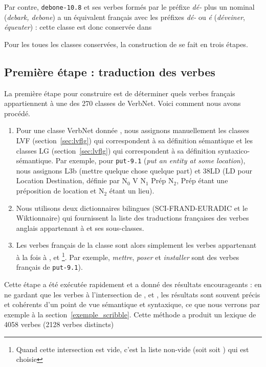Par contre, {\color{blue}\texttt{debone-10.8}} et ses verbes formés par le
préfixe \textit{dé-} plus un nominal (\textit{debark, debone}) a un équivalent
français avec les préfixes \textit{dé-} ou \textit{é} (\textit{déveiner},
\textit{équeuter}) : cette classe est donc conservée dans \verbenet{}

Pour les toues les classes conservées, la construction de \verbenet{} se fait
en trois étapes.

\subsection{Première étape : traduction des verbes}\label{first}

La première étape pour construire \verbenet{} est de déterminer quels verbes
français appartiennent à une des 270 classes de VerbNet. Voici comment nous
avons procédé.

\begin{enumerate}
    \item Pour une classe VerbNet donnée \Ce{}, nous assignons manuellement les
        classes LVF (section~\ref{sec:lvflg}) \Clvf{} qui correspondent à sa
        définition sémantique et les classes LG (section~\ref{sec:lvflg})
        \Clg{} qui correspondent à sa définition syntaxico-sémantique. Par
        exemple, pour {\color{blue}\texttt{put-9.1}} (\textit{put an entity at
        some location}), nous assignons {\color{red}L3b} (mettre quelque chose
        quelque part) et {\color{green}38LD} (LD pour Location Destination,
        définie par N$_0$ V N$_1$ Prép N$_2$, Prép étant une préposition de
        location et N$_2$ étant un lieu).
    \item Nous utilisons deux dictionnaires bilingues (SCI-FRAND-EURADIC et le
        Wiktionnaire) qui fournissent la liste \Ltrad{} des traductions
        françaises des verbes anglais appartenant à \Ce{} et ses sous-classes.
    \item Les verbes français de la classe \Ce{} sont alors simplement les
        verbes appartenant à la fois à \Ltrad{}, \Clvf{} et
        \Clg{}\footnote{Quand cette intersection est vide, c'est la liste
        non-vide (soit \Clvf{} soit \Clg{}) qui est choisie}. Par exemple,
        \textit{mettre}, \textit{poser} et \textit{installer} sont des verbes
        français de {\color{blue}\texttt{put-9.1}}).
\end{enumerate}

Cette étape a été exécutée rapidement et a donné des résultats encourageants :
en ne gardant que les verbes à l'intersection de \Ltrad{}, \Clvf{} et \Clg{},
les résultats sont souvent précis et cohérents d'un point de vue sémantique et
syntaxique, ce que nous verrons par exemple à la
section~\ref{exemple_scribble}. Cette méthode a produit un lexique de 4058
verbes (2128 verbes distincts)

